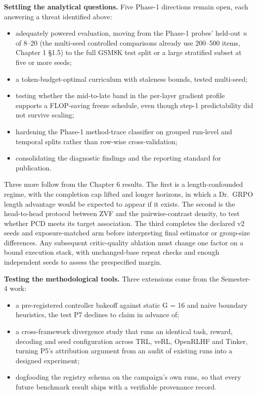 \documentclass[12pt,a4paper]{report}
\providecommand{\tightlist}{%
  \setlength{\itemsep}{0pt}\setlength{\parskip}{0pt}}
\begin{document}
\textbf{Settling the analytical questions.} Five Phase-1 directions
remain open, each answering a threat identified above:

\begin{itemize}
\tightlist
\item
  adequately powered evaluation, moving from the Phase-1 probes'
  held-out \emph{n} of 8--20 (the multi-seed controlled comparisons
  already use 200--500 items, Chapter 1 §1.5) to the full GSM8K test
  split or a large stratified subset at five or more seeds;
\item
  a token-budget-optimal curriculum with staleness bounds, tested
  multi-seed;
\item
  testing whether the mid-to-late band in the per-layer gradient profile
  supports a FLOP-saving freeze schedule, even though step-1
  predictability did not survive scaling;
\item
  hardening the Phase-1 method-trace classifier on grouped run-level and
  temporal splits rather than row-wise cross-validation;
\item
  consolidating the diagnostic findings and the reporting standard for
  publication.
\end{itemize}

Three more follow from the Chapter 6 results. The first is a
length-confounded regime, with the completion cap lifted and longer
horizons, in which a Dr.~GRPO length advantage would be expected to
appear if it exists. The second is the head-to-head protocol between ZVF
and the pairwise-contrast density, to test whether PCD meets its target
association. The third completes the declared v2 seeds and
exposure-matched arm before interpreting final estimator or group-size
differences. Any subsequent critic-quality ablation must change one
factor on a bound execution stack, with unchanged-base repeat checks and
enough independent seeds to assess the prespecified margin.

\textbf{Testing the methodological tools.} Three extensions come from
the Semester-4 work:

\begin{itemize}
\tightlist
\item
  a pre-registered controller bakeoff against static G = 16 and naive
  boundary heuristics, the test P7 declines to claim in advance of;
\item
  a cross-framework divergence study that runs an identical task,
  reward, decoding and seed configuration across TRL, veRL, OpenRLHF and
  Tinker, turning P5's attribution argument from an audit of existing
  runs into a designed experiment;
\item
  dogfooding the registry schema on the campaign's own runs, so that
  every future benchmark result ships with a verifiable provenance
  record.
\end{itemize}
\end{document}
